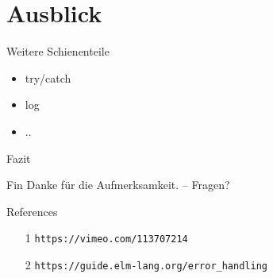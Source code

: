 \documentclass[compress]{beamer}
\begin{document}

  \section{Ausblick}
  \begin{frame}{Weitere Schienenteile}
    \begin{itemize}
      \item try/catch
      \item log
      \item ..
    \end{itemize}
  \end{frame}
  \begin{frame}{Fazit}
  \end{frame}
  
  \begin{frame}{Fin}
    Danke für die Aufmerksamkeit. -- Fragen?
  \end{frame}
  \begin{frame}{References}
    \begin{itemize}
      \item[1] \texttt{https://vimeo.com/113707214}
      \item[2] \texttt{https://guide.elm-lang.org/error\_handling}
    \end{itemize}
  \end{frame}
\end{document}
